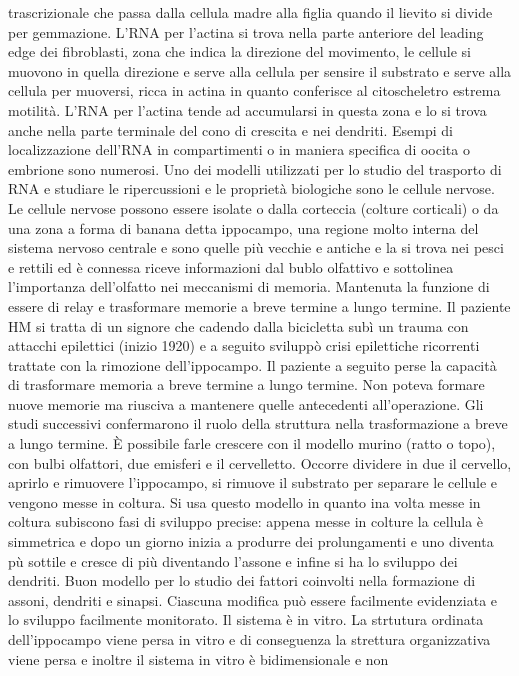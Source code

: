 trascrizionale che passa dalla cellula madre alla figlia quando il lievito si divide per gemmazione. L'RNA per l'actina si trova nella parte anteriore del leading edge dei fibroblasti, 
zona che indica la direzione del movimento, le cellule si muovono in quella direzione e serve alla cellula per sensire il substrato e serve alla cellula per muoversi, ricca in actina
in quanto conferisce al citoscheletro estrema motilit\`a. L'RNA per l'actina tende ad accumularsi in questa zona e lo si trova anche nella parte terminale del cono di crescita e nei 
dendriti. Esempi di localizzazione dell'RNA in compartimenti o in maniera specifica di oocita o embrione sono numerosi. Uno dei modelli utilizzati per lo studio del trasporto di RNA e 
studiare le ripercussioni e le propriet\`a biologiche sono le cellule nervose. Le cellule nervose possono essere isolate o dalla corteccia (colture corticali) o da una zona a forma 
di banana detta ippocampo, una regione molto interna del sistema nervoso centrale e sono quelle pi\`u vecchie e antiche e la si trova nei pesci e rettili ed \`e connessa riceve 
informazioni dal bublo olfattivo e sottolinea l'importanza dell'olfatto nei meccanismi di memoria. Mantenuta la funzione di essere di relay e trasformare memorie a breve termine a lungo
termine. Il paziente HM si tratta di un signore che cadendo dalla bicicletta sub\`i un trauma con attacchi epilettici (inizio 1920) e a seguito svilupp\`o crisi epilettiche ricorrenti
trattate con la rimozione dell'ippocampo. Il paziente a seguito perse la capacit\`a di trasformare memoria a breve termine a lungo termine. Non poteva formare nuove memorie ma riusciva 
a mantenere quelle antecedenti all'operazione. Gli studi successivi confermarono il ruolo della struttura nella trasformazione a breve a lungo termine. \`E possibile farle crescere con
il modello murino (ratto o topo), con bulbi olfattori, due emisferi e il cervelletto. Occorre dividere in due il cervello, aprirlo e rimuovere l'ippocampo, si rimuove il substrato per 
separare le cellule e vengono messe in coltura. Si usa questo modello in quanto ina volta messe in coltura subiscono fasi di sviluppo precise: appena messe in colture la cellula \`e 
simmetrica e dopo un giorno inizia a produrre dei prolungamenti e uno diventa p\`u sottile e cresce di pi\`u diventando l'assone e infine si ha lo sviluppo dei dendriti. Buon modello
per lo studio dei fattori coinvolti nella formazione di assoni, dendriti e sinapsi. Ciascuna modifica pu\`o essere facilmente evidenziata e lo sviluppo facilmente monitorato. Il sistema
\`e in vitro. La strtutura ordinata dell'ippocampo viene persa in vitro e di conseguenza la strettura organizzativa viene persa e inoltre il sistema in vitro \`e bidimensionale e non
